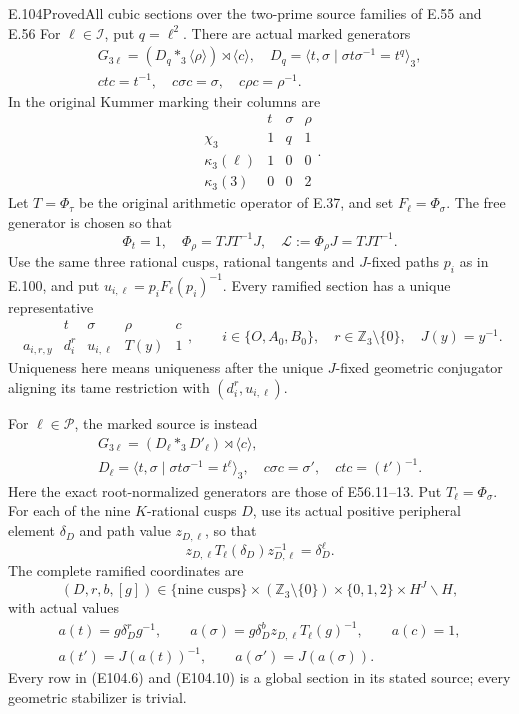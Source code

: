 \begin{statement}{E.104}{Proved}{All cubic sections over the two-prime source families of E.55 and E.56}
For $\ell\in\mathscr I$, put $q=\ell^2$.
There are actual marked generators
\[
 \begin{gathered}
 G_{3\ell}=(D_q\mathop{*}_3\langle\rho\rangle)
                       \rtimes\langle c\rangle,
 \quad D_q=\langle t,\sigma\mid\sigma t\sigma^{-1}=t^q\rangle_3,\\
 ctc=t^{-1},\quad c\sigma c=\sigma,\quad c\rho c=\rho^{-1}.
 \end{gathered}
 \tag{E104.3}
\]
In the original Kummer marking their columns are
\[
 \begin{array}{c|ccc}
  &t&\sigma&\rho\\\hline
  \chi_3&1&q&1\\
  \kappa_3(\ell)&1&0&0\\
  \kappa_3(3)&0&0&2
 \end{array}.
 \tag{E104.4}
\]
Let $T=\Phi_\tau$ be the original arithmetic operator
of E.37, and set $F_\ell=\Phi_\sigma$.
The free generator is chosen so that
\[
 \Phi_t=1,\quad \Phi_\rho=TJT^{-1}J,
 \quad\mathcal L:=\Phi_\rho J=TJT^{-1}.
 \tag{E104.5}
\]
Use the same three rational cusps, rational tangents
and $J$-fixed paths $p_i$ as in E.100, and put
$u_{i,\ell}=p_iF_\ell(p_i)^{-1}$.
Every ramified section has a unique representative
\[
 \begin{array}{c|cccc}
    &t&\sigma&\rho&c\\\hline
  a_{i,r,y}&d_i^r&u_{i,\ell}&T(y)&1
 \end{array},\qquad
 i\in\{O,A_0,B_0\},\quad
 r\in\mathbb Z_3\setminus\{0\},\quad J(y)=y^{-1}.
 \tag{E104.6}
\]
Uniqueness here means uniqueness after the unique
$J$-fixed geometric conjugator aligning its tame
restriction with $(d_i^r,u_{i,\ell})$.

For $\ell\in\mathscr P$, the marked source is instead
\[
 \begin{gathered}
 G_{3\ell}=(D_\ell\mathop{*}_3D'_\ell)
                          \rtimes\langle c\rangle,\\
 D_\ell=\langle t,\sigma\mid\sigma t\sigma^{-1}=t^\ell\rangle_3,
 \quad c\sigma c=\sigma',\quad ctc=(t')^{-1}.
 \end{gathered}
 \tag{E104.7}
\]
Here the exact root-normalized generators are those
of E56.11--13. Put $T_\ell=\Phi_\sigma$.
For each of the nine $K$-rational cusps $D$, use its
actual positive peripheral element $\delta_D$ and
path value $z_{D,\ell}$, so that
\[
 z_{D,\ell}T_\ell(\delta_D)z_{D,\ell}^{-1}
                         =\delta_D^\ell.
 \tag{E104.8}
\]
The complete ramified coordinates are
\[
 (D,r,b,[g])\in
 \{\text{nine cusps}\}\times
 (\mathbb Z_3\setminus\{0\})\times\{0,1,2\}
                         \times H^J\backslash H,
 \tag{E104.9}
\]
with actual values
\[
 \begin{gathered}
 a(t)=g\delta_D^r g^{-1},\qquad
 a(\sigma)=g\delta_D^b z_{D,\ell}T_\ell(g)^{-1},\qquad a(c)=1,\\
 a(t')=J(a(t))^{-1},\qquad a(\sigma')=J(a(\sigma)).
 \end{gathered}
 \tag{E104.10}
\]
Every row in (E104.6) and (E104.10) is a global section
in its stated source; every geometric stabilizer is trivial.


\end{statement}
